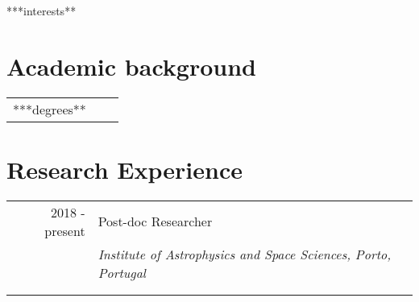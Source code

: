 \documentclass[10pt]{article}
\begin{document}
  ***interests**

\fi

\newcommand{\degree}[6]{\textsc{#1} & #2 in \textsc{#3} & \textbf{#4}\\
                        & \ifthenelse{\equal{#5}{}}{\small ~}{\small Advisors: #5} & \\
                        & \ifthenelse{\equal{#6}{}}{~}{\footnotesize Dissertation: ``#6''} & \\[1ex]
                        }

\newcommand{\experience}[4]{#1 & #2 \\
                            \ifthenelse{\equal{#3}{}}{}{ \nopagebreak &\emph{#3}\\ }
                            \ifthenelse{\equal{#4}{}}{}{ \nopagebreak &\footnotesize{#4} \\ }
                            \nopagebreak \multicolumn{2}{c}{} \\ [-1ex]
                            }

\section{Academic background}
  \begin{tabularx}{\linewidth}{@{}r X l}

    ***degrees**

  \end{tabularx}

  \vspace{-3em}


\section{Research Experience}
\begin{tabularx}{\linewidth}{@{}r X l}

  \experience{2018 - present}
             {Post-doc Researcher}
             {Institute of Astrophysics and Space Sciences, Porto, Portugal}
             {}

\end{tabularx}


\end{document}
